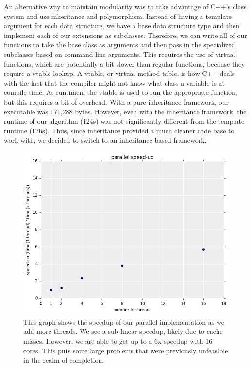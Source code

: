 An alternative way to maintain modularity was to take advantage of C++'s class system and use inheritance and polymorphism.
Instead of having a template argument for each data structure, we have a base data structure type and then implement each of our extensions as subclasses.
Therefore, we can write all of our functions to take the base class as arguments and then pass in the specialized subclasses based on command line arguments.
This requires the use of virtual functions, which are potentially a bit slower than regular functions, because they require a vtable lookup.
A vtable, or virtual method table, is how C++ deals with the fact that the compiler might not know what class a variable is at compile time.
At runtimem the vtable is used to run the appropriate function, but this requires a bit of overhead.
With a pure inheritance framework, our executable was 171,288 bytes.
However, even with the inheritance framework, the runtime of our algorithm (124s) was not significantly different from the template runtime (126s).
Thus, since inheritance provided a much cleaner code base to work with, we decided to switch to an inheritance based framework.

\begin{figure}[t!]
	\begin{center}
	\includegraphics[width=\textwidth]{figs/parallel_speedup.png}
	\caption{This graph shows the speedup of our parallel implementation as we add more threads. 
We see a sub-linear speedup, likely due to cache misses.
However, we are able to get up to a 6x speedup with 16 cores.
This puts some large problems that were previously unfeasible in the realm of completion.}
	\label{fig:parallel}
	\end{center}
\end{figure}

